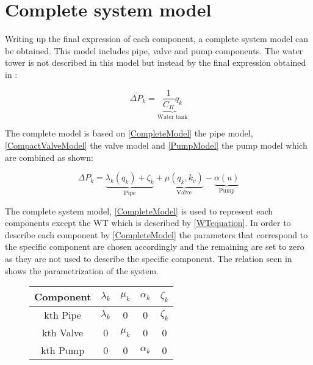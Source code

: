 \section{Complete system model} 
\label{CompleteSystemModel}

Writing up the final expression of each component, a complete system model can be obtained. This model includes pipe, valve and pump components. The water tower is not described in this model but instead by the final expression obtained in :

\begin{equation}
  \label{CompleteWTModel}
  \dot{\Delta P_k} = \underbrace{\frac{1}{C_H}q_k}_\text{Water tank} 
\end{equation}


 The complete model is based on \eqref{CompleteModel} the pipe model, \eqref{CompactValveModel} the valve model and \eqref{PumpModel} the pump model which are combined as shown:

\begin{equation}
  \label{CompleteModel}
  \Delta P_k = \underbrace{\lambda_k (q_k) + \zeta_k}_\text{Pipe} + \underbrace{\mu (q_k, k_v)}_\text{Valve} - \underbrace{\alpha (u)}_\text{Pump} 
\end{equation}



The complete system model, \eqref{CompleteModel} is used to represent each components except the WT which is described by \eqref{WTequation}. In order to describe each component by \eqref{CompleteModel} the parameters that correspond to the specific component are chosen accordingly and the remaining are set to zero as they are not used to describe the specific component. 
The relation seen in  shows the parametrization of the system.

\begin{figure}[H]
	\centering
\begin{tabular}{c|cccc} 
  			\bfseries Component    &     $\lambda_k$    &    $\mu_k$    &   $\alpha_k$    &  $\zeta_k$  		\\ \hline
			kth Pipe		  	   &     $\lambda_k$    &    0          &   0             &  $\zeta_k$   	    \\ 
			kth Valve              &     0              &    $\mu_k$    &   0 		      &  0    				\\ 
			kth Pump 		       &     0              &    0          &   $\alpha_k$    &  0    			    
\end{tabular}
		\label{tab:parametrization_model}

\end{figure}	


